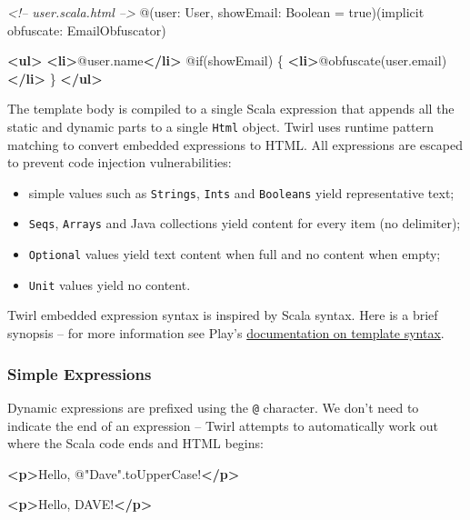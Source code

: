 \documentclass[oneside,11pt,a4paper,]{book}
\newenvironment{Shaded}{\begin{snugshade}}{\end{snugshade}}
\newcommand{\KeywordTok}[1]{\textcolor[rgb]{0.13,0.29,0.53}{\textbf{{#1}}}}
\newcommand{\CommentTok}[1]{\textcolor[rgb]{0.56,0.35,0.01}{\textit{{#1}}}}
\newcommand{\NormalTok}[1]{{#1}}
\begin{document}
\begin{Shaded}
\begin{Highlighting}[]
\CommentTok{<!-- user.scala.html -->}
\NormalTok{@(user: User, showEmail: Boolean = true)(implicit obfuscate: EmailObfuscator)}

\KeywordTok{<ul>}
  \KeywordTok{<li>}\NormalTok{@user.name}\KeywordTok{</li>}
  \NormalTok{@if(showEmail) \{}
    \KeywordTok{<li>}\NormalTok{@obfuscate(user.email)}\KeywordTok{</li>}
  \NormalTok{\}}
\KeywordTok{</ul>}
\end{Highlighting}
\end{Shaded}

The template body is compiled to a single Scala expression that appends
all the static and dynamic parts to a single \texttt{Html} object. Twirl
uses runtime pattern matching to convert embedded expressions to HTML.
All expressions are escaped to prevent code injection vulnerabilities:

\begin{itemize}
\itemsep1pt\parskip0pt
\item
  simple values such as \texttt{Strings}, \texttt{Ints} and
  \texttt{Booleans} yield representative text;
\item
  \texttt{Seqs}, \texttt{Arrays} and Java collections yield content for
  every item (no delimiter);
\item
  \texttt{Optional} values yield text content when full and no content
  when empty;
\item
  \texttt{Unit} values yield no content.
\end{itemize}

Twirl embedded expression syntax is inspired by Scala syntax. Here is a
brief synopsis -- for more information see Play's
\href{https://www.playframework.com/documentation/2.3.x/ScalaTemplates}{documentation
on template syntax}.

\subsubsection{Simple Expressions}\label{simple-expressions}

Dynamic expressions are prefixed using the \texttt{@} character. We
don't need to indicate the end of an expression -- Twirl attempts to
automatically work out where the Scala code ends and HTML begins:

\begin{multicols}{2}

\begin{Shaded}
\begin{Highlighting}[]
\KeywordTok{<p>}\NormalTok{Hello, @"Dave".toUpperCase!}\KeywordTok{</p>}
\end{Highlighting}
\end{Shaded}

\columnbreak

\begin{Shaded}
\begin{Highlighting}[]
\KeywordTok{<p>}\NormalTok{Hello, DAVE!}\KeywordTok{</p>}
\end{Highlighting}
\end{Shaded}

\end{multicols}
\end{document}
